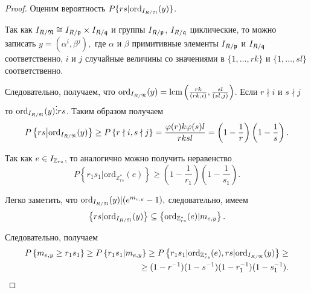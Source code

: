 \documentclass[_00_dissertation.tex]{subfiles}
\begin{document}
\begin{proof}
    Оценим вероятность $P\{rs | \textrm{ord}_{I_{R / \mathfrak{N}}}(y)\}$.

    Так как $I_{R / \mathfrak{N}} \cong I_{R / \mathfrak{p}} \times I_{R / \mathfrak{q}}$ и группы $I_{R / \mathfrak{p}}$, $I_{R / \mathfrak{q}}$ циклические, то можно записать $y = (\alpha^i, \beta^j),$ где $\alpha$ и $\beta$ примитивные элементы $I_{R / \mathfrak{p}}$ и $I_{R / \mathfrak{q}}$ соответственно, $i$ и $j$ случайные величины со значениями в $\{1, \ldots, rk\}$ и $\{1, \ldots, sl\}$ соответственно.
    
    Следовательно, получаем, что $\textrm{ord}_{I_{R / \mathfrak{N}}}(y) = \textrm{lcm}\left(\frac{rk}{(rk,i)}, \frac{sl}{(sl,j)}\right)$.
    Если $r \nmid i$ и $s \nmid j$ то $\textrm{ord}_{I_{R / \mathfrak{N}}}(y) \vdots rs$.
    Таким образом получаем
    \begin{equation*}
        P\left\{
            rs \big| \textrm{ord}_{I_{R / \mathfrak{N}}}(y)
        \right\} \ge P\left\{
            r\nmid i, s \nmid j
        \right\} = \frac{\varphi(r)k\varphi(s)l}{rksl} = \left(
            1-\frac{1}{r}
        \right)\left(
            1-\frac{1}{s}
        \right).
    \end{equation*}

    Так как $e \in I_{\mathbb{Z}_{rs}}$, то аналогично можно получить неравенство
    \begin{equation*}
        P\left\{
            r_1s_1|\textrm{ord}_{\mathbb{Z}^*_{rs}}(e)
        \right\} \ge \left(
            1-\frac{1}{r_1}
        \right)\left(
            1-\frac{1}{s_1}
        \right).
    \end{equation*}

    Легко заметить, что $\textrm{ord}_{I_{R / \mathfrak{N}}}(y) | (e^{m_{e,y}}-1),$ следовательно, имеем
    \begin{equation*}
        \left\{
            rs | \textrm{ord}_{I_{R / \mathfrak{N}}}(y)
        \right\} \subseteq \left\{
            \textrm{ord}_{\mathbb{Z}^*_{rs}}(e) | m_{e,y}
        \right\}.
    \end{equation*}

    Следовательно, получаем
    \begin{equation*}
        \begin{split}
            P\left\{
                m_{e,y} \ge r_1s_1
            \right\} \ge P\left\{
                r_1s_1 | m_{e,y}
            \right\} \ge P\left\{
                r_1s_1|\textrm{ord}_{\mathbb{Z}^*_{rs}}(e), rs|\textrm{ord}_{I_{R / \mathfrak{N}}}(y)
            \right\} \ge \\
            \ge (1-r^{-1})(1-s^{-1})(1-r_1^{-1})(1-s_1^{-1}).
        \end{split}
    \end{equation*}
\end{proof}
\end{document}
